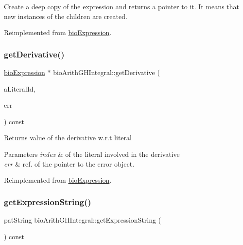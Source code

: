 Create a deep copy of the expression and returns a pointer to it. It means that new instances of the children are created. 

Reimplemented from \hyperlink{classbio_expression_a4ee1b8add634078a02eaae26cd40dcc8}{bio\+Expression}.

\mbox{\label{classbio_arith_g_h_integral_a3e017f569acbc481366ad4472ee2734d}} 
\subsubsection{\texorpdfstring{get\+Derivative()}{getDerivative()}}
{\footnotesize\ttfamily \hyperlink{classbio_expression}{bio\+Expression} $\ast$ bio\+Arith\+G\+H\+Integral\+::get\+Derivative (\begin{DoxyParamCaption}\item[{pat\+U\+Long}]{a\+Literal\+Id,  }\item[{pat\+Error $\ast$\&}]{err }\end{DoxyParamCaption}) const\hspace{0.3cm}{\ttfamily [virtual]}}

\begin{DoxyReturn}{Returns}
value of the derivative w.\+r.\+t literal 
\end{DoxyReturn}

\begin{DoxyParams}{Parameters}
{\em index} & of the literal involved in the derivative \\
\hline
{\em err} & ref. of the pointer to the error object. \\
\hline
\end{DoxyParams}


Reimplemented from \hyperlink{classbio_expression_a5915579d1193f25f216c1e273c97f2ce}{bio\+Expression}.

\mbox{\label{classbio_arith_g_h_integral_aa245fc792bcd733e143896c9f8d33a64}} 
\subsubsection{\texorpdfstring{get\+Expression\+String()}{getExpressionString()}}
{\footnotesize\ttfamily pat\+String bio\+Arith\+G\+H\+Integral\+::get\+Expression\+String (\begin{DoxyParamCaption}{ }\end{DoxyParamCaption}) const\hspace{0.3cm}{\ttfamily [virtual]}}

